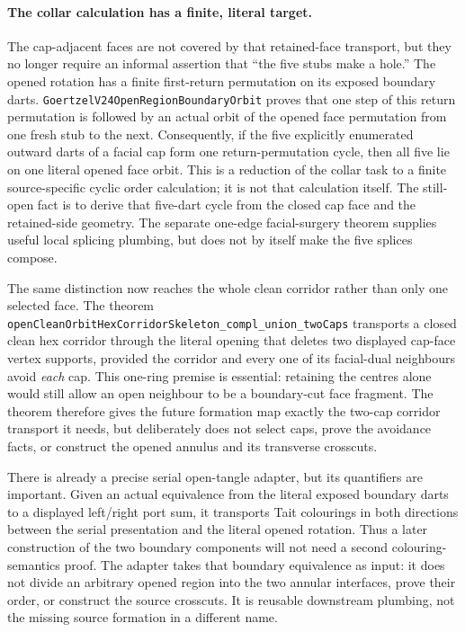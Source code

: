 \documentclass[11pt]{article}
\theoremstyle{definition}
\begin{document}
\paragraph{The collar calculation has a finite, literal target.}
The cap-adjacent faces are not covered by that retained-face transport, but
they no longer require an informal assertion that ``the five stubs make a
hole.''  The opened rotation has a finite first-return permutation on its
exposed boundary darts.  \texttt{GoertzelV24OpenRegionBoundaryOrbit} proves
that one step of this return permutation is followed by an actual orbit of
the opened face permutation from one fresh stub to the next.  Consequently,
if the five explicitly enumerated outward darts of a facial cap form one
return-permutation cycle, then all five lie on one literal opened face orbit.
This is a reduction of the collar task to a finite source-specific cyclic
order calculation; it is not that calculation itself.  The still-open fact is
to derive that five-dart cycle from the closed cap face and the retained-side
geometry.  The separate one-edge facial-surgery theorem supplies useful local
splicing plumbing, but does not by itself make the five splices compose.

The same distinction now reaches the whole clean corridor rather than only
one selected face.  The theorem
\texttt{openCleanOrbitHexCorridorSkeleton\_compl\_union\_twoCaps} transports
a closed clean hex corridor through the literal opening that deletes two
displayed cap-face vertex supports, provided the corridor and every one of its
facial-dual neighbours avoid \emph{each} cap.  This one-ring premise is
essential: retaining the centres alone would still allow an open neighbour to
be a boundary-cut face fragment.  The theorem therefore gives the future
formation map exactly the two-cap corridor transport it needs, but deliberately
does not select caps, prove the avoidance facts, or construct the opened
annulus and its transverse crosscuts.

There is already a precise serial open-tangle adapter, but its quantifiers are
important.  Given an actual equivalence from the literal exposed boundary
darts to a displayed left/right port sum, it transports Tait colourings in
both directions between the serial presentation and the literal opened
rotation.  Thus a later construction of the two boundary components will not
need a second colouring-semantics proof.  The adapter takes that boundary
equivalence as input: it does not divide an arbitrary opened region into the
two annular interfaces, prove their order, or construct the source crosscuts.
It is reusable downstream plumbing, not the missing source formation in a
different name.
\end{document}
